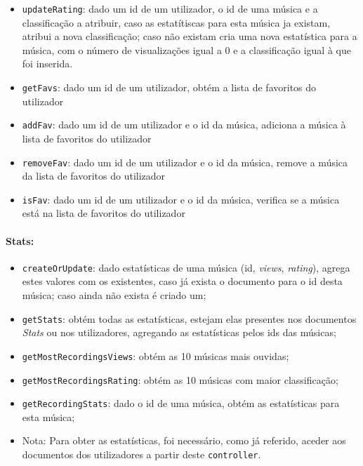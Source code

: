 \documentclass{article}
\begin{document}
\begin{itemize}
        \item \texttt{updateRating}: dado um id de um utilizador, o id de uma música e a classificação a atribuir, caso as estatítiscas para esta música ja existam, atribui a nova classificação; caso não existam cria uma nova estatística para a música, com o número de visualizações igual a 0 e a classificação igual à que foi inserida.
        \item \texttt{getFavs}: dado um id de um utilizador, obtém a lista de favoritos do utilizador
        \item \texttt{addFav}: dado um id de um utilizador e o id da música, adiciona a música à lista de favoritos do utilizador
        \item \texttt{removeFav}: dado um id de um utilizador e o id da música, remove a música da lista de favoritos do utilizador
        \item \texttt{isFav}: dado um id de um utilizador e o id da música, verifica se a música está na lista de favoritos do utilizador

    \end{itemize}

\paragraph{\textbf{Stats:}}
    \begin{itemize}
        \item \texttt{createOrUpdate}: dado estatísticas de uma música (id, \textit{views}, \textit{rating}), agrega estes valores com os existentes, caso já exista o documento para o id desta música; caso ainda não exista é criado um;
        \item \texttt{getStats}: obtém todas as estatísticas, estejam elas presentes nos documentos \textit{Stats} ou nos utilizadores, agregando as estatísticas pelos ids das músicas;
        \item \texttt{getMostRecordingsViews}: obtém as 10 músicas mais ouvidas;
        \item \texttt{getMostRecordingsRating}: obtém as 10 músicas com maior classificação;
        \item \texttt{getRecordingStats}: dado o id de uma música, obtém as estatísticas para esta música;
        \item Nota: Para obter as estatísticas, foi necessário, como já referido, aceder aos documentos dos utilizadores a partir deste \texttt{controller}.
    \end{itemize}
\end{document}
